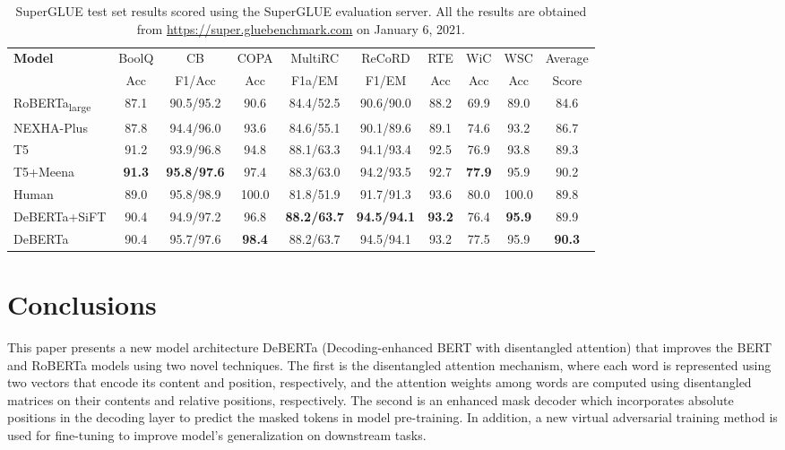 \documentclass{article}
\begin{document}
\begin{table*}[htb!]
    \centering
    \begin{tabular}{@{\hskip2pt}l@{\hskip2pt}|@{\hskip2pt} @{\hskip1pt}c@{\hskip1pt}|@{\hskip2pt}c@{\hskip1pt}|@{\hskip2pt}c@{\hskip1pt}|c@{\hskip1pt}|c@{\hskip1pt}|c@{\hskip1pt}|c@{\hskip1pt}|c@{\hskip1pt}|@{\hskip2pt}c@{\hskip1pt}}
        \toprule
        \multirow{2}{*}{\bf Model} & BoolQ &CB&COPA&MultiRC&ReCoRD&RTE&WiC&WSC& Average\\ 
         & Acc & F1/Acc & Acc &F1a/EM&F1/EM&Acc&Acc&Acc& Score\\
        \midrule
RoBERTa\textsubscript{large} & 87.1  & 90.5/95.2 & 90.6 &84.4/52.5&90.6/90.0&88.2&69.9 &89.0 &84.6\\  \hline
        NEXHA-Plus                  & 87.8  & 94.4/96.0 & 93.6 &84.6/55.1&90.1/89.6&89.1&74.6 &93.2 &86.7\\  \hline
        T5 &91.2  & 93.9/96.8 & 94.8 &88.1/63.3&94.1/93.4&92.5&76.9 &93.8 &89.3\\ 
        \hline
        T5+Meena &\textbf{91.3}  & \textbf{95.8/97.6} & 97.4 &88.3/63.0&94.2/93.5&92.7&\textbf{77.9} &95.9 &90.2\\ 
        \hline \hline
        Human  &89.0 & 95.8/98.9 & 100.0 &81.8/51.9&91.7/91.3&93.6&80.0 &100.0 &89.8\\  \hline \hline
        DeBERTa+SiFT &90.4  & 94.9/97.2 & 96.8&\textbf{88.2/63.7}&\textbf{94.5/94.1}&\textbf{93.2}&76.4 &	\textbf{95.9} & 89.9\\  
        DeBERTa &90.4  & 95.7/97.6 & \textbf{98.4}&88.2/63.7&94.5/94.1&93.2&77.5 &	95.9 & \textbf{90.3}\\
        \bottomrule
        \end{tabular}
    \caption{
SuperGLUE test set results scored using the SuperGLUE evaluation server. All the results are obtained from \href{https://super.gluebenchmark.com}{https://super.gluebenchmark.com} on January 6, 2021.
    }
    \label{tab:superglue}
    
\end{table*}


 \section{Conclusions}
\label{sec:conclusion}

This paper presents a new model architecture DeBERTa (Decoding-enhanced BERT with disentangled attention) that improves the BERT and RoBERTa models using two novel techniques. 
The first is the disentangled attention mechanism, where
each word is represented using two vectors that encode its content and position, respectively, and the attention weights among words are computed using disentangled matrices on their contents and relative positions, respectively. 
The second is an enhanced mask decoder which incorporates absolute positions in the decoding layer to predict the masked tokens in model pre-training. 
In addition, a new virtual adversarial training method is used for fine-tuning to improve model's generalization on downstream tasks.
\end{document}
